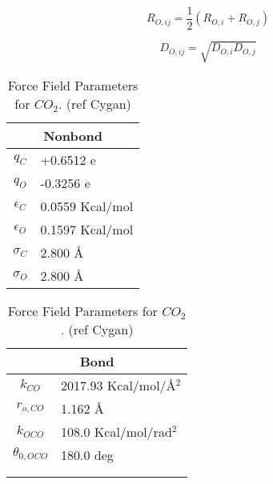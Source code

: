 \documentclass[twoside,english]{uiofysmaster}
\begin{document}
\begin{equation}
R_{O,ij} = \frac{1}{2}(R_{O,i} + R_{O,j})
\end{equation}

\begin{equation}
D_{O,ij} = \sqrt{D_{O,i}D_{O,j}}
\end{equation}

\begin{table}
 \caption{Force Field Parameters for $CO_2$. (ref Cygan)}
 \begin{tabular}[]{|c|l|}
  \hline
  \multicolumn{2}{|c|}{Nonbond} \\ \hline
  $q_C$ & +0.6512 e  \\ \hline
  $q_O$ & -0.3256 e  \\ \hline
  $\epsilon _C$ & 0.0559 Kcal/mol \\ \hline
  $\epsilon _O$ & 0.1597 Kcal/mol \\ \hline
  $\sigma _C$ & 2.800 \AA{} \\ \hline
  $\sigma _O$ & 2.800 \AA{} \\ \hline
 \end{tabular}
  \begin{tabular}[]{|c|l|}
  \hline
  \multicolumn{2}{|c|}{Bond} \\ \hline
  $k_{CO}$ & 2017.93 Kcal/mol/\AA{}$^2$  \\ \hline
  $r_{o,CO}$ & 1.162 \AA{}  \\ \hline
  $k_{OCO}$ & 108.0 Kcal/mol/rad$^2$ \\ \hline
  $\theta _{0,OCO}$ & 180.0 deg \\ \hline
                    &           \\ \hline
                    &           \\ \hline

 \end{tabular}
 \label{ForceFieldParameters_CO2}
\end{table}
\end{document}
